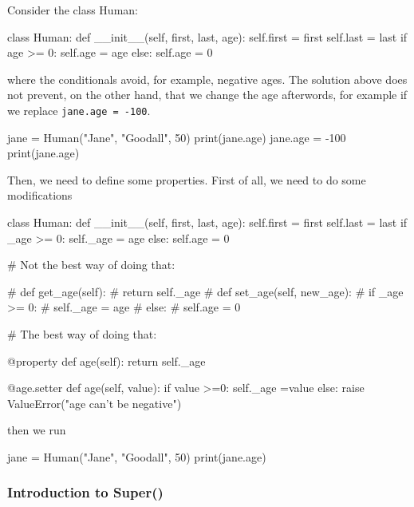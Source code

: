 Consider the class Human:
\begin{listing}{1}
class Human: 
    def __init__(self, first, last, age):
        self.first = first 
        self.last = last
        if age >= 0:
            self.age = age
        else:
            self.age = 0
\end{listing}
where the conditionals avoid, for example, negative ages. The solution above does not prevent, on the other hand, that we change the age afterwords, for example if we replace \verb|jane.age = -100|. 
\begin{listingcont}
jane = Human("Jane", "Goodall", 50)
print(jane.age)
jane.age = -100
print(jane.age)
\end{listingcont}
Then, we need to define some properties. First of all, we need to do some modifications
\begin{listing}{1}
class Human: 
    def __init__(self, first, last, age):
        self.first = first 
        self.last = last
        if _age >= 0:
            self._age = age
        else:
            self.age = 0

# Not the best way of doing that:

#       def get_age(self):
#          return self._age
#       def set_age(self, new_age):
#           if _age >= 0:
#               self._age = age
#           else:
#               self.age = 0
 
# The best way of doing that:

    @property
    def age(self):
        return self._age

    @age.setter 
    def age(self, value):
        if value >=0:
            self._age =value
        else:
            raise ValueError("age can't be negative")
\end{listing}
then we run
\begin{listingcont}
jane = Human("Jane", "Goodall", 50)
print(jane.age)
\end{listingcont}

\subsubsection{Introduction to Super()}

